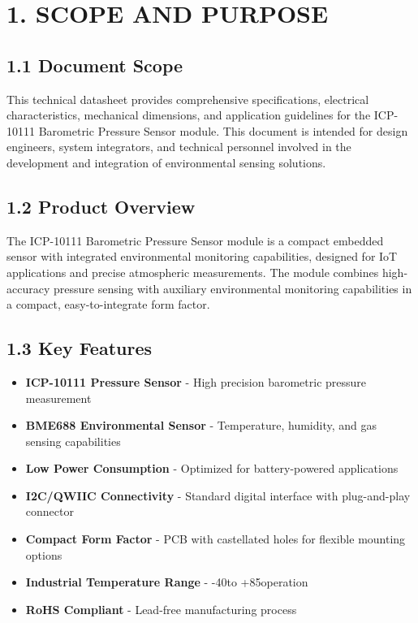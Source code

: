 \documentclass[11pt,a4paper]{article}
\begin{document}

\tableofcontents
\newpage



\listoffigures
\newpage



\listoftables
\newpage




\section{1. SCOPE AND PURPOSE}

\subsection{1.1 Document Scope}

This technical datasheet provides comprehensive specifications, electrical characteristics, mechanical dimensions, and application guidelines for the ICP-10111 Barometric Pressure Sensor module. This document is intended for design engineers, system integrators, and technical personnel involved in the development and integration of environmental sensing solutions.

\subsection{1.2 Product Overview}

The ICP-10111 Barometric Pressure Sensor module is a compact embedded sensor with integrated environmental monitoring capabilities, designed for IoT applications and precise atmospheric measurements. The module combines high-accuracy pressure sensing with auxiliary environmental monitoring capabilities in a compact, easy-to-integrate form factor.

\subsection{1.3 Key Features}

\begin{itemize}
\item \textbf{ICP-10111 Pressure Sensor} - High precision barometric pressure measurement
\item \textbf{BME688 Environmental Sensor} - Temperature, humidity, and gas sensing capabilities
\item \textbf{Low Power Consumption} - Optimized for battery-powered applications
\item \textbf{I2C/QWIIC Connectivity} - Standard digital interface with plug-and-play connector
\item \textbf{Compact Form Factor} - PCB with castellated holes for flexible mounting options
\item \textbf{Industrial Temperature Range} - -40\degreeC to +85\degreeC operation
\item \textbf{RoHS Compliant} - Lead-free manufacturing process
\end{itemize}
\end{document}
